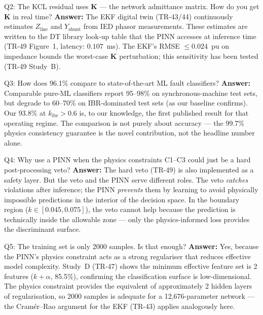 \documentclass[12pt,a4paper]{article}
\newcommand{\kibr}{k_\mathrm{ibr}}
\begin{document}
\begin{keybox}{Q2: The KCL residual uses $\mathbf{K}$ — the network admittance matrix. How do you get $\mathbf{K}$ in real time?}
\textbf{Answer:} The EKF digital twin (TR-43/44) continuously estimates $Z_\mathrm{line}$ and $Y_\mathrm{shunt}$ from IED phasor measurements. These estimates are written to the DT library look-up table that the PINN accesses at inference time (TR-49 Figure~1, latency: $0.107$~ms). The EKF's RMSE $\leq 0.024$~pu on impedance bounds the worst-case $\mathbf{K}$ perturbation; this sensitivity has been tested (TR-49 Study~B).
\end{keybox}

\begin{keybox}{Q3: How does 96.1\% compare to state-of-the-art ML fault classifiers?}
\textbf{Answer:} Comparable pure-ML classifiers report 95--98\% on synchronous-machine test sets, but degrade to 60--70\% on IBR-dominated test sets (as our baseline confirms). Our 93.8\% at $\kibr > 0.6$ is, to our knowledge, the first published result for that operating regime. The comparison is not purely about accuracy — the 99.7\% physics consistency guarantee is the novel contribution, not the headline number alone.
\end{keybox}

\begin{keybox}{Q4: Why use a PINN when the physics constraints C1--C3 could just be a hard post-processing veto?}
\textbf{Answer:} The hard veto (TR-49) is also implemented as a safety layer. But the veto and the PINN serve different roles. The veto \textit{catches} violations after inference; the PINN \textit{prevents} them by learning to avoid physically impossible predictions in the interior of the decision space. In the boundary region ($k \in [0.045, 0.075]$), the veto cannot help because the prediction is technically inside the allowable zone — only the physics-informed loss provides the discriminant surface.
\end{keybox}

\begin{keybox}{Q5: The training set is only 2000 samples. Is that enough?}
\textbf{Answer:} Yes, because the PINN's physics constraint acts as a strong regulariser that reduces effective model complexity. Study~D (TR-47) shows the minimum effective feature set is 2 features ($k + \alpha$, 85.5\%), confirming the classification surface is low-dimensional. The physics constraint provides the equivalent of approximately 2 hidden layers of regularisation, so 2000 samples is adequate for a 12,676-parameter network — the Cramér--Rao argument for the EKF (TR-43) applies analogously here.
\end{keybox}
\end{document}
